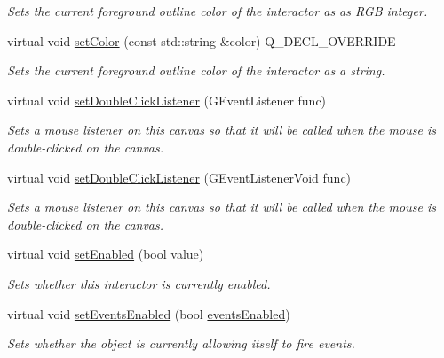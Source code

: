 \begin{DoxyCompactItemize}
\begin{DoxyCompactList}\small\item\em Sets the current foreground outline color of the interactor as as R\+GB integer. \end{DoxyCompactList}\item 
virtual void \mbox{\hyperlink{classGCanvas_ad148324da1b0340e84e24dffa577ffca}{set\+Color}} (const std\+::string \&color) Q\+\_\+\+D\+E\+C\+L\+\_\+\+O\+V\+E\+R\+R\+I\+DE
\begin{DoxyCompactList}\small\item\em Sets the current foreground outline color of the interactor as a string. \end{DoxyCompactList}\item 
virtual void \mbox{\hyperlink{classGCanvas_ac29f9a3462458e165fae3a1f046ee77a}{set\+Double\+Click\+Listener}} (G\+Event\+Listener func)
\begin{DoxyCompactList}\small\item\em Sets a mouse listener on this canvas so that it will be called when the mouse is double-\/clicked on the canvas. \end{DoxyCompactList}\item 
virtual void \mbox{\hyperlink{classGCanvas_a50096194d66f48c92dd4c512d41bfc76}{set\+Double\+Click\+Listener}} (G\+Event\+Listener\+Void func)
\begin{DoxyCompactList}\small\item\em Sets a mouse listener on this canvas so that it will be called when the mouse is double-\/clicked on the canvas. \end{DoxyCompactList}\item 
virtual void \mbox{\hyperlink{classGInteractor_ab831367dd84bbd579e02e55bacb21343}{set\+Enabled}} (bool value)
\begin{DoxyCompactList}\small\item\em Sets whether this interactor is currently enabled. \end{DoxyCompactList}\item 
virtual void \mbox{\hyperlink{classGObservable_afaa30b2a9e0f378fd1c70d2f1d0b8216}{set\+Events\+Enabled}} (bool \mbox{\hyperlink{classGInteractor_ac05ba5b92e2e5146d416fe7f842a0969}{events\+Enabled}})
\begin{DoxyCompactList}\small\item\em Sets whether the object is currently allowing itself to fire events. \end{DoxyCompactList}\item 

\end{DoxyCompactItemize}
